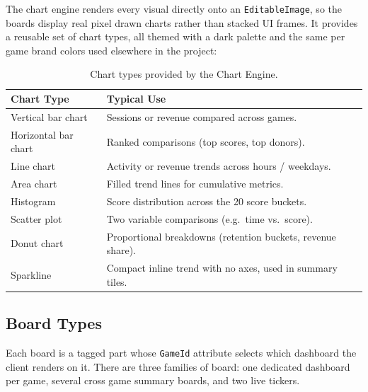 \documentclass[12pt,letterpaper]{article}
\begin{document}
The chart engine renders every visual directly onto an \texttt{EditableImage}, so the boards display real pixel drawn charts rather than stacked UI frames. It provides a reusable set of chart types, all themed with a dark palette and the same per game brand colors used elsewhere in the project:

\begin{table}[H]
\centering
\footnotesize
\begin{tabular}{|p{5cm}|p{10.5cm}|}
\hline
\textbf{Chart Type} & \textbf{Typical Use} \\
\hline
Vertical bar chart & Sessions or revenue compared across games. \\
\hline
Horizontal bar chart & Ranked comparisons (top scores, top donors). \\
\hline
Line chart & Activity or revenue trends across hours / weekdays. \\
\hline
Area chart & Filled trend lines for cumulative metrics. \\
\hline
Histogram & Score distribution across the 20 score buckets. \\
\hline
Scatter plot & Two variable comparisons (e.g.\ time vs.\ score). \\
\hline
Donut chart & Proportional breakdowns (retention buckets, revenue share). \\
\hline
Sparkline & Compact inline trend with no axes, used in summary tiles. \\
\hline
\end{tabular}
\caption{Chart types provided by the Chart Engine.}
\end{table}

\subsection{Board Types}

Each board is a tagged part whose \texttt{GameId} attribute selects which dashboard the client renders on it. There are three families of board: one dedicated dashboard per game, several cross game summary boards, and two live tickers.
\end{document}
